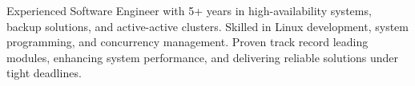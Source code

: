 

\begin{cvparagraph}

Experienced Software Engineer with 5+ years in high-availability systems, backup solutions, and active-active clusters. Skilled in Linux development, system programming, and concurrency management. Proven track record leading modules, enhancing system performance, and delivering reliable solutions under tight deadlines.
\end{cvparagraph}
